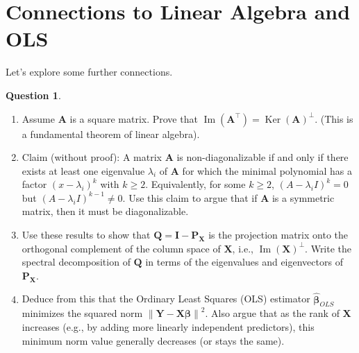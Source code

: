 \documentclass[11pt, a4paper]{article}
\DeclareMathOperator{\Image}{\mathrm{Im}}        %
\DeclareMathOperator{\Ker}{\mathrm{Ker}}         %
\theoremstyle{definition}
\newtheorem{question}[theorem]{Question} %
\theoremstyle{remark}
\newcommand{\mat}[1]{\mathbf{#1}}       %
\newcommand{\vect}[1]{\bm{#1}}          %
\newcommand{\transpose}{^{\top}}        %
\newcommand{\norm}[1]{\left\| #1 \right\|} %
\begin{document}
\section{Connections to Linear Algebra and OLS}

Let's explore some further connections.

\begin{question} \label{q:ker_im_relation}
\begin{enumerate}
    \item Assume $\mat{A}$ is a square matrix. Prove that $\Image(\mat{A}\transpose) = \Ker(\mat{A})^{\perp}$. (This is a fundamental theorem of linear algebra).
    \item Claim (without proof): A matrix $\mat{A}$ is non-diagonalizable if and only if there exists at least one eigenvalue $\lambda_i$ of $\mat{A}$ for which the minimal polynomial has a factor $(x-\lambda_i)^k$ with $k \geq 2$. Equivalently, for some $k \geq 2$, $(A-\lambda_i I)^k = 0$ but $(A-\lambda_i I)^{k-1} \neq 0$. Use this claim to argue that if $\mat{A}$ is a symmetric matrix, then it must be diagonalizable.
    \item Use these results to show that $\mat{Q} = \mat{I} - \mat{P}_{\mat{X}}$ is the projection matrix onto the orthogonal complement of the column space of $\mat{X}$, i.e., $\Image(\mat{X})^{\perp}$. Write the spectral decomposition of $\mat{Q}$ in terms of the eigenvalues and eigenvectors of $\mat{P}_{\mat{X}}$.
    \item Deduce from this that the Ordinary Least Squares (OLS) estimator $\hat{\vect{\beta}}_{OLS}$ minimizes the squared norm $\norm{\vect{Y} - \mat{X}\vect{\beta}}^2$. Also argue that as the rank of $\mat{X}$ increases (e.g., by adding more linearly independent predictors), this minimum norm value generally decreases (or stays the same).
\end{enumerate}
\end{question}
\end{document}
